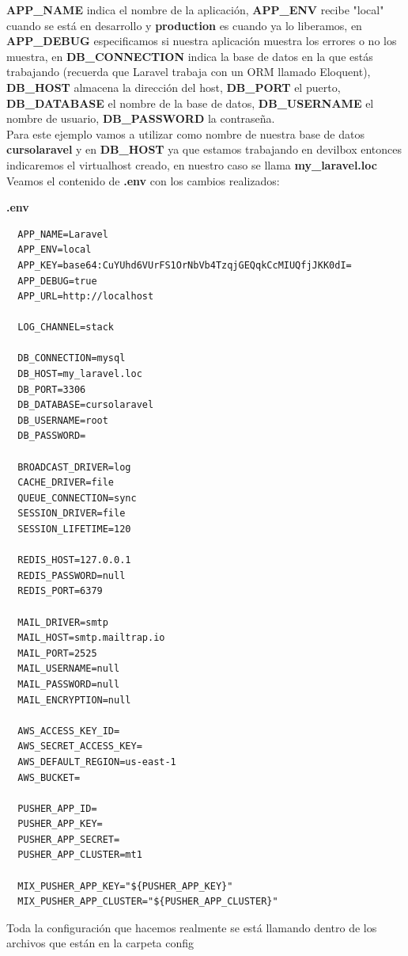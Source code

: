 \documentclass{article}
\begin{document}
\textbf{APP\_NAME} indica el nombre de la aplicación, \textbf{APP\_ENV} recibe
"local" cuando se está en desarrollo y \textbf{production} es cuando ya lo
liberamos, en \textbf{APP\_DEBUG} especificamos si nuestra aplicación muestra
los errores o no los muestra, en \textbf{DB\_CONNECTION} indica la base de datos
en la que estás trabajando (recuerda que Laravel trabaja con un ORM llamado
Eloquent), \textbf{DB\_HOST} almacena la dirección del host, \textbf{DB\_PORT} el
puerto, \textbf{DB\_DATABASE} el nombre de la base de datos,
\textbf{DB\_USERNAME} el nombre de usuario, \textbf{DB\_PASSWORD} la
contraseña.\\

Para este ejemplo vamos a utilizar como nombre de nuestra base de datos
\textbf{cursolaravel} y en  \textbf{DB\_HOST} ya que estamos trabajando en
devilbox entonces indicaremos el virtualhost creado, en nuestro caso se llama
\textbf{my\_laravel.loc}\\

Veamos el contenido de \textbf{.env} con los cambios realizados:

\textbf{.env}
\begin{verbatim}
  APP_NAME=Laravel
  APP_ENV=local
  APP_KEY=base64:CuYUhd6VUrFS1OrNbVb4TzqjGEQqkCcMIUQfjJKK0dI=
  APP_DEBUG=true
  APP_URL=http://localhost

  LOG_CHANNEL=stack

  DB_CONNECTION=mysql
  DB_HOST=my_laravel.loc
  DB_PORT=3306
  DB_DATABASE=cursolaravel
  DB_USERNAME=root
  DB_PASSWORD=

  BROADCAST_DRIVER=log
  CACHE_DRIVER=file
  QUEUE_CONNECTION=sync
  SESSION_DRIVER=file
  SESSION_LIFETIME=120

  REDIS_HOST=127.0.0.1
  REDIS_PASSWORD=null
  REDIS_PORT=6379

  MAIL_DRIVER=smtp
  MAIL_HOST=smtp.mailtrap.io
  MAIL_PORT=2525
  MAIL_USERNAME=null
  MAIL_PASSWORD=null
  MAIL_ENCRYPTION=null

  AWS_ACCESS_KEY_ID=
  AWS_SECRET_ACCESS_KEY=
  AWS_DEFAULT_REGION=us-east-1
  AWS_BUCKET=

  PUSHER_APP_ID=
  PUSHER_APP_KEY=
  PUSHER_APP_SECRET=
  PUSHER_APP_CLUSTER=mt1

  MIX_PUSHER_APP_KEY="${PUSHER_APP_KEY}"
  MIX_PUSHER_APP_CLUSTER="${PUSHER_APP_CLUSTER}"
\end{verbatim}


Toda la configuración que hacemos realmente se está llamando dentro de los
archivos que están en la carpeta config\\
\end{document}
